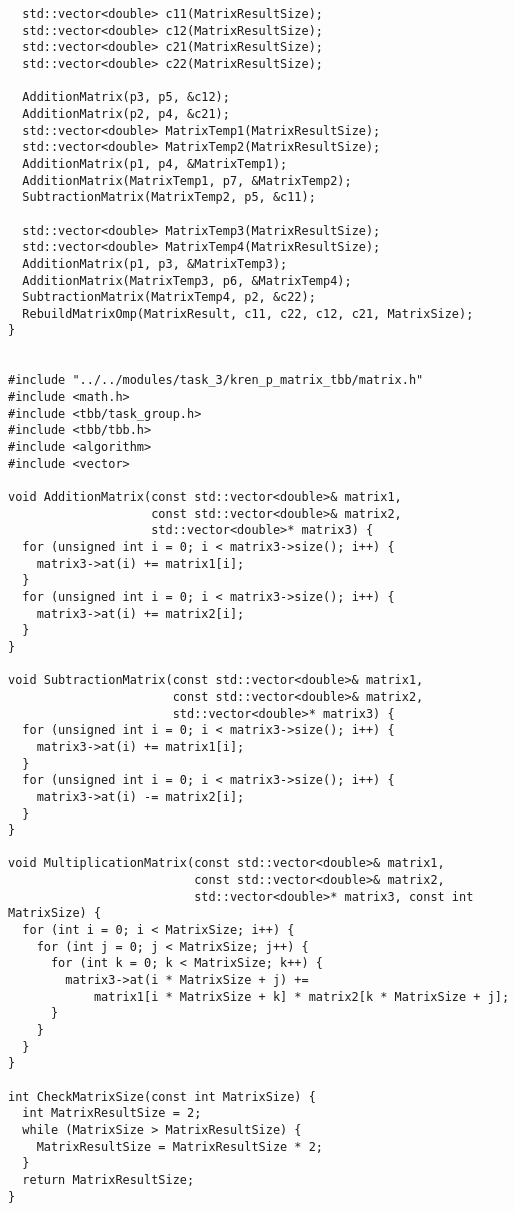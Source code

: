 \documentclass{report}
\begin{document}
\begin{lstlisting}
  std::vector<double> c11(MatrixResultSize);
  std::vector<double> c12(MatrixResultSize);
  std::vector<double> c21(MatrixResultSize);
  std::vector<double> c22(MatrixResultSize);

  AdditionMatrix(p3, p5, &c12);
  AdditionMatrix(p2, p4, &c21);
  std::vector<double> MatrixTemp1(MatrixResultSize);
  std::vector<double> MatrixTemp2(MatrixResultSize);
  AdditionMatrix(p1, p4, &MatrixTemp1);
  AdditionMatrix(MatrixTemp1, p7, &MatrixTemp2);
  SubtractionMatrix(MatrixTemp2, p5, &c11);

  std::vector<double> MatrixTemp3(MatrixResultSize);
  std::vector<double> MatrixTemp4(MatrixResultSize);
  AdditionMatrix(p1, p3, &MatrixTemp3);
  AdditionMatrix(MatrixTemp3, p6, &MatrixTemp4);
  SubtractionMatrix(MatrixTemp4, p2, &c22);
  RebuildMatrixOmp(MatrixResult, c11, c22, c12, c21, MatrixSize);
}


#include "../../modules/task_3/kren_p_matrix_tbb/matrix.h"
#include <math.h>
#include <tbb/task_group.h>
#include <tbb/tbb.h>
#include <algorithm>
#include <vector>

void AdditionMatrix(const std::vector<double>& matrix1,
                    const std::vector<double>& matrix2,
                    std::vector<double>* matrix3) {
  for (unsigned int i = 0; i < matrix3->size(); i++) {
    matrix3->at(i) += matrix1[i];
  }
  for (unsigned int i = 0; i < matrix3->size(); i++) {
    matrix3->at(i) += matrix2[i];
  }
}

void SubtractionMatrix(const std::vector<double>& matrix1,
                       const std::vector<double>& matrix2,
                       std::vector<double>* matrix3) {
  for (unsigned int i = 0; i < matrix3->size(); i++) {
    matrix3->at(i) += matrix1[i];
  }
  for (unsigned int i = 0; i < matrix3->size(); i++) {
    matrix3->at(i) -= matrix2[i];
  }
}

void MultiplicationMatrix(const std::vector<double>& matrix1,
                          const std::vector<double>& matrix2,
                          std::vector<double>* matrix3, const int MatrixSize) {
  for (int i = 0; i < MatrixSize; i++) {
    for (int j = 0; j < MatrixSize; j++) {
      for (int k = 0; k < MatrixSize; k++) {
        matrix3->at(i * MatrixSize + j) +=
            matrix1[i * MatrixSize + k] * matrix2[k * MatrixSize + j];
      }
    }
  }
}

int CheckMatrixSize(const int MatrixSize) {
  int MatrixResultSize = 2;
  while (MatrixSize > MatrixResultSize) {
    MatrixResultSize = MatrixResultSize * 2;
  }
  return MatrixResultSize;
}


\end{lstlisting}
\end{document}
